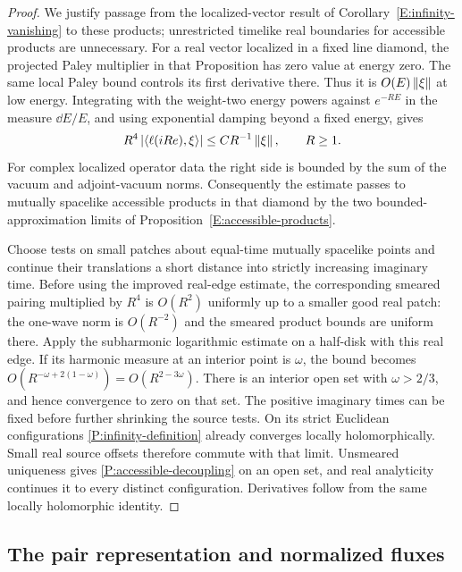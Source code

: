 \begin{proof}
We justify passage from the localized-vector result of
Corollary~\ref{E:infinity-vanishing} to these products; unrestricted
timelike real boundaries for accessible products are unnecessary.
For a real vector localized in a fixed line diamond, the projected
Paley multiplier in that Proposition has zero value at energy zero.
The same local Paley bound controls its first derivative there.  Thus
it is $O(E)\left\lVert\xi\right\rVert$ at low energy.  Integrating with the
weight-two energy powers against $e^{-RE}$ in the measure $\dd E/E$,
and using exponential damping beyond a fixed energy, gives
\begin{equation}
 R^4\left\lvert\left\langle\ell(iRe),\xi\right\rangle\right\rvert
       \leq C R^{-1}\left\lVert\xi\right\rVert,\qquad R\geq1.
 \label{P:infinity-rate}
\end{equation}
For complex localized operator data the right side is bounded by the
sum of the vacuum and adjoint-vacuum norms.  Consequently the estimate
passes to mutually spacelike accessible products in that diamond by
the two bounded-approximation limits of
Proposition~\ref{E:accessible-products}.

Choose tests on small patches about equal-time mutually spacelike
points and continue their translations a short distance into strictly
increasing imaginary time.  Before using the improved real-edge
estimate, the corresponding smeared pairing multiplied by $R^4$ is
$O(R^2)$ uniformly up to a smaller good real patch: the one-wave norm
is $O(R^{-2})$ and the smeared product bounds are uniform there.  Apply
the subharmonic logarithmic estimate on a half-disk with this real
edge.  If its harmonic measure at an interior point is $\omega$, the
bound becomes
$O(R^{-\omega+2(1-\omega)})=O(R^{2-3\omega})$.
There is an interior open set with $\omega>2/3$, and hence convergence
to zero on that set.  The positive imaginary times can be fixed before
further shrinking the source tests.  On its strict Euclidean
configurations \eqref{P:infinity-definition} already converges locally
holomorphically.  Small real source offsets therefore commute with
that limit.  Unsmeared uniqueness gives
\eqref{P:accessible-decoupling} on an open set, and real analyticity
continues it to every distinct configuration.  Derivatives follow
from the same locally holomorphic identity.
\end{proof}

\subsection{The pair representation and normalized fluxes}

